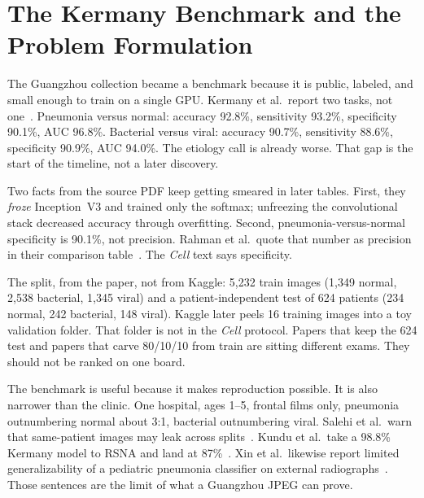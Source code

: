 \documentclass[11pt,a4paper]{article}
\begin{document}
\section{The Kermany Benchmark and the Problem Formulation}
The Guangzhou collection became a benchmark because it is public, labeled, and small enough to train on a single GPU. Kermany et al.\ report two tasks, not one~\cite{kermany2018}. Pneumonia versus normal: accuracy 92.8\%, sensitivity 93.2\%, specificity 90.1\%, AUC 96.8\%. Bacterial versus viral: accuracy 90.7\%, sensitivity 88.6\%, specificity 90.9\%, AUC 94.0\%. The etiology call is already worse. That gap is the start of the timeline, not a later discovery.

Two facts from the source PDF keep getting smeared in later tables. First, they \emph{froze} Inception~V3 and trained only the softmax; unfreezing the convolutional stack decreased accuracy through overfitting. Second, pneumonia-versus-normal specificity is 90.1\%, not precision. Rahman et al.\ quote that number as precision in their comparison table~\cite{rahman2020}. The \textit{Cell} text says specificity.

The split, from the paper, not from Kaggle: 5{,}232 train images (1{,}349 normal, 2{,}538 bacterial, 1{,}345 viral) and a patient-independent test of 624 patients (234 normal, 242 bacterial, 148 viral). Kaggle later peels 16 training images into a toy validation folder. That folder is not in the \textit{Cell} protocol. Papers that keep the 624 test and papers that carve 80/10/10 from train are sitting different exams. They should not be ranked on one board.

The benchmark is useful because it makes reproduction possible. It is also narrower than the clinic. One hospital, ages 1--5, frontal films only, pneumonia outnumbering normal about 3:1, bacterial outnumbering viral. Salehi et al.\ warn that same-patient images may leak across splits~\cite{salehi2021}. Kundu et al.\ take a 98.8\% Kermany model to RSNA and land at 87\%~\cite{kundu2021}. Xin et al.\ likewise report limited generalizability of a pediatric pneumonia classifier on external radiographs~\cite{xin2021}. Those sentences are the limit of what a Guangzhou JPEG can prove.
\end{document}
